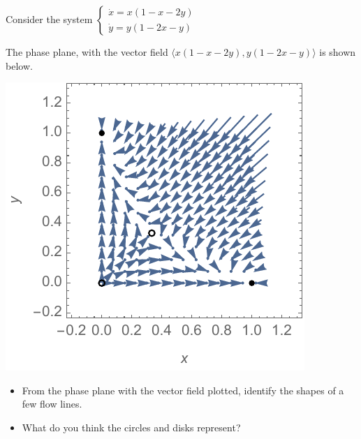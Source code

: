 \documentclass[12pt,letterpaper,noanswers]{exam}
\begin{document}
    Consider the system $\left\{\begin{array}{l}\dot x = x(1-x-2y) \\
    \dot y = y(1-2x-y)\end{array}\right.$
    
    The phase plane, with the vector field $\langle x(1-x-2y), y(1-2x-y)\rangle$ is shown below.
    
    \includegraphics{img/C34phase2.pdf}
    
    \begin{itemize}
        \item From the phase plane with the vector field plotted, identify the shapes of a few flow lines.
        \vspace{1in}
        
        \item What do you think the circles and disks represent?
    \end{itemize}
    
    \vspace{0.5in}
    
\end{document}
